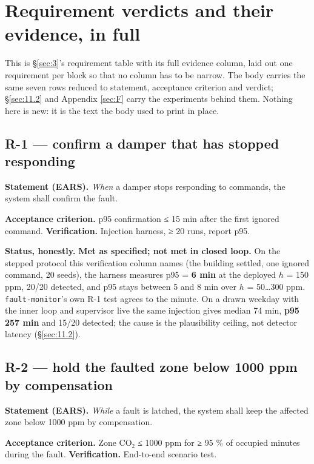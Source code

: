 \section{Requirement verdicts and their evidence, in full}\label{sec:A}

This is \S\ref{sec:3}'s requirement table with its full evidence column, laid out one requirement per block
so that no column has to be narrow. The body carries the same seven rows reduced to statement,
acceptance criterion and verdict; \S\ref{sec:11.2} and Appendix \ref{sec:F} carry the experiments behind them. Nothing
here is new: it is the text the body used to print in place.

\subsection{R-1 --- confirm a damper that has stopped responding}\label{sec:A.1}

\textbf{Statement (EARS).} \emph{When} a damper stops responding to commands, the system shall confirm the fault.

\textbf{Acceptance criterion.} p95 confirmation ≤ 15 min after the first ignored command. \quad \textbf{Verification.} Injection harness, ≥ 20 runs,
report p95.

\textbf{Status, honestly.} \textbf{Met as specified; not met in closed loop.} On the stepped protocol this
verification column names (the building settled, one ignored command, 20 seeds), the harness
measures p95 = \textbf{6 min} at the deployed $h$ = 150 ppm, 20/20 detected, and p95 stays between
5 and 8 min over $h$ = 50…300 ppm. \texttt{fault-monitor}'s own R-1 test agrees to the minute. On a
drawn weekday with the inner loop and supervisor live the same injection gives median 74 min,
\textbf{p95 257 min} and 15/20 detected; the cause is the plausibility ceiling, not detector
latency (§\ref{sec:11.2}).

\subsection{R-2 --- hold the faulted zone below 1000 ppm by compensation}\label{sec:A.2}

\textbf{Statement (EARS).} \emph{While} a fault is latched, the system shall keep the affected zone below 1000 ppm by
compensation.

\textbf{Acceptance criterion.} Zone CO₂ ≤ 1000 ppm for ≥ 95 \% of occupied minutes during the fault. \quad \textbf{Verification.} End-to-end scenario test.

